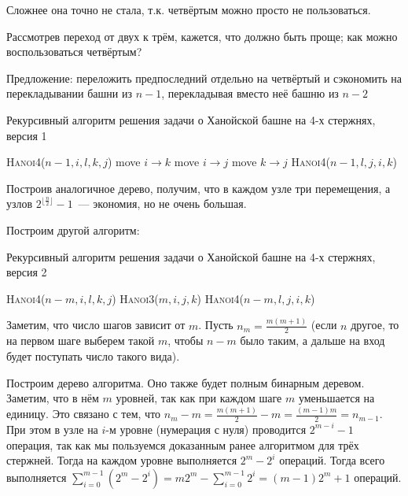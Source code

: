 \documentclass[12pt,a4paper]{article}
\begin{document}
Сложнее она точно не стала, т.к. четвёртым можно просто не пользоваться.

Рассмотрев переход от двух к трём, кажется, что должно быть проще; как можно воспользоваться четвёртым?

Предложение: переложить предпоследний отдельно на четвёртый и сэкономить на перекладывании башни из $n-1$, перекладывая вместо неё башню из $n-2$

\begin{algorithm}
\caption{Рекурсивный алгоритм решения задачи о Ханойской башне на 4-х стержнях, версия 1}
\begin{algorithmic}[1]
    \State \textsc{Hanoi4}($n-1,i,l,k,j$)
    \State move $i \to k$
    \State move $i \to j$
    \State move $k \to j$
    \State \textsc{Hanoi4}($n-1,l,j,i,k$)
\EndIf
\EndFunction
\end{algorithmic}
\end{algorithm}

Построив аналогичное дерево, получим, что в каждом узле три перемещения, а узлов $2^{\lfloor\frac{n}{2}\rfloor} - 1$~--- экономия, но не очень большая.

Построим другой алгоритм:

\begin{algorithm}
\caption{Рекурсивный алгоритм решения задачи о Ханойской башне на 4-х стержнях, версия 2}
\begin{algorithmic}[1]
    \State \textsc{Hanoi4}($n-m,i,l,k,j$)
    \State \textsc{Hanoi3}($m,i,j,k$)
    \State \textsc{Hanoi4}($n-m,l,j,i,k$)
\EndIf
\EndFunction
\end{algorithmic}
\end{algorithm}

Заметим, что число шагов зависит от $m$. Пусть $n_m=\frac{m(m+1)}{2}$ (если $n$ другое, то на первом шаге выберем такой $m$, чтобы $n-m$ было таким, а дальше на вход будет поступать число такого вида).

Построим дерево алгоритма. Оно также будет полным бинарным деревом. Заметим, что в нём $m$ уровней, так как при каждом шаге $m$ уменьшается на единицу. Это связано с тем, что $n_m - m = \frac{m(m+1)}{2} - m = \frac{(m-1)m}{2} = n_{m-1}$. При этом в узле на $i$-м уровне (нумерация с нуля) проводится $2^{m-i} - 1$ операция, так как мы пользуемся доказанным ранее алгоритмом для трёх стержней. Тогда на каждом уровне выполняется $2^m - 2^i$ операций. Тогда всего выполняется $\sum\limits_{i=0}^{m-1} (2^m - 2^i) = m2^m - \sum\limits_{i=0}^{m-1} 2^i = (m-1)2^m + 1$ операций.
\end{document}
